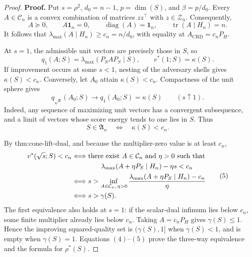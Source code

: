 \documentclass{article}
\begin{document}
\begin{proof}
\textbf{Proof.}
Put \(s=\rho^2\), \(d_0=n-1\), \(p=\dim(S)\), and \(\beta=p/d_0\). Every \(A\in\mathcal C_n\) is a convex combination of matrices \(zz^\top\) with \(z\in\mathcal Z_n\). Consequently,
\[
A\succeq0,
\qquad
A\mathbf1_n=0,
\qquad
\operatorname{diag}(A)=\mathbf1_n,
\qquad
\operatorname{tr}(A\mid H_n)=n.
\tag{1}
\]
It follows that \(\lambda_{\max}(A\mid H_n)\geq c_n=n/d_0\), with equality at \(A_{\mathrm{CRD}}=c_nP_H\).

At \(s=1\), the admissible unit vectors are precisely those in \(S\), so
\[
q_1(A;S)=\lambda_{\max}(P_SAP_S\mid S),
\qquad
v^*(1;S)=\kappa(S).
\tag{2}
\]
If improvement occurs at some \(s<1\), nesting of the adversary shells gives \(\kappa(S)<c_n\). Conversely, let \(A_0\) attain \(\kappa(S)<c_n\). Compactness of the unit sphere gives
\[
q_{\sqrt{s}}(A_0;S)\longrightarrow q_1(A_0;S)=\kappa(S)
\qquad(s\uparrow1).
\tag{3}
\]
Indeed, any sequence of maximizing unit vectors has a convergent subsequence, and a limit of vectors whose score energy tends to one lies in \(S\). Thus
\[
S\in\mathfrak A_n
\quad\Longleftrightarrow\quad
\kappa(S)<c_n.
\tag{4}
\]

By \(\text{thm:cone-lift-dual}\), and because the multiplier-zero value is at least \(c_n\),
\[
\begin{aligned}
v^*(\sqrt{s};S)<c_n
&\Longleftrightarrow
\text{there exist }A\in\mathcal C_n\text{ and }\eta>0\text{ such that}\\
&\hspace{1.5cm}
\lambda_{\max}(A+\eta P_S\mid H_n)-\eta s<c_n\\
&\Longleftrightarrow
s>\inf_{A\in\mathcal C_n,\,\eta>0}
\frac{\lambda_{\max}(A+\eta P_S\mid H_n)-c_n}{\eta}\\
&\Longleftrightarrow s>\gamma(S).
\end{aligned}
\tag{5}
\]
The first equivalence also holds at \(s=1\): if the scalar-dual infimum lies below \(c_n\), some finite multiplier already lies below \(c_n\). Taking \(A=c_nP_H\) gives \(\gamma(S)\leq1\). Hence the improving squared-quality set is \((\gamma(S),1]\) when \(\gamma(S)<1\), and is empty when \(\gamma(S)=1\). Equations \((4)\)--\((5)\) prove the three-way equivalence and the formula for \(\rho^*(S)\).


\end{proof}
\end{document}
